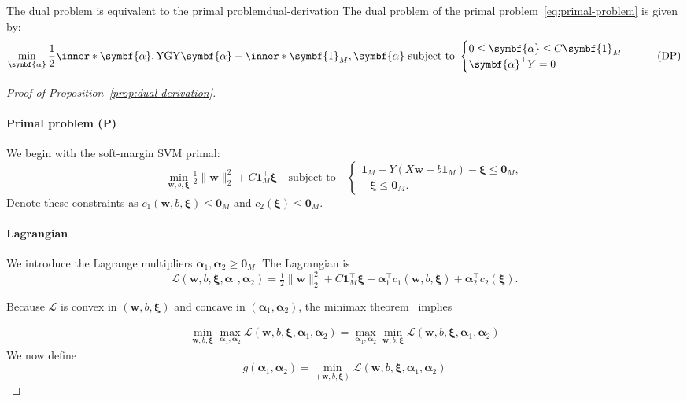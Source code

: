 \begin{proposition}{The dual problem is equivalent to the primal problem}{dual-derivation}
	The dual problem of the primal problem~\eqref{eq:primal-problem} is given by:
	\[
		\min_{\symbf{\alpha}} \frac{1}{2} \inner*{\symbf{\alpha}, \mathrm{Y} \mathrm{G} \mathrm{Y} \symbf{\alpha}} -  \inner*{\symbf{1}_M, \symbf{\alpha}} \text{ subject to }
		\begin{cases}
			0 \leq \symbf{\alpha} \leq C\symbf{1}_M \\
			\symbf{\alpha}^\top Y = 0
		\end{cases} \tag{DP}
	\]

\end{proposition}
\begin{proof}[Proof of Proposition~\ref{prop:dual-derivation}]
	\paragraph{Primal problem (P)}
	We begin with the soft-margin SVM primal:
	\[
		\min_{\symbf{w}, b, \symbf{\xi}}
		\tfrac12\|\symbf{w}\|_2^2
		+ C\symbf{1}_M^\top \symbf{\xi}
		\quad\text{subject to}\quad
		\begin{cases}
			\symbf{1}_M - Y\left(X\symbf{w} + b\symbf{1}_M\right)-\symbf{\xi}\le\symbf{0}_M, \\
			-\symbf{\xi}\le\symbf{0}_M.
		\end{cases}
	\]
	Denote these constraints as \(c_1(\symbf{w}, b, \symbf{\xi}) \le \symbf{0}_M\) and \(c_2(\symbf{\xi}) \le \symbf{0}_M.\)

	\paragraph{Lagrangian}
	We introduce the Lagrange multipliers
	\(\symbf{\alpha}_1,\symbf{\alpha}_2 \ge \symbf{0}_M.
	\)
	The Lagrangian is
	\[
		\mathcal{L}\left(\symbf{w}, b, \symbf{\xi}, \symbf{\alpha}_1,\symbf{\alpha}_2\right) =\tfrac12\|\symbf{w}\|_2^2 +C\symbf{1}_M^\top \symbf{\xi} +\symbf{\alpha}_1^\top c_1(\symbf{w},b,\symbf{\xi}) +\symbf{\alpha}_2^\top c_2(\symbf{\xi}).
	\]

	Because $\mathcal{L}$ is convex in $(\symbf{w},b,\symbf{\xi})$ and concave in $(\symbf{\alpha}_1,\symbf{\alpha}_2)$, the minimax theorem~\cite{vonNeumann1928} implies

	\begin{align*}
		\min_{\symbf{w},b,\symbf{\xi}}\max_{\symbf{\alpha}_1,\symbf{\alpha}_2}\mathcal{L}(\symbf{w},b,\symbf{\xi},\symbf{\alpha}_1,\symbf{\alpha}_2)= \max_{\symbf{\alpha}_1,\symbf{\alpha}_2}\min_{\symbf{w},b,\symbf{\xi}}\mathcal{L}(\symbf{w},b,\symbf{\xi},\symbf{\alpha}_1,\symbf{\alpha}_2)
	\end{align*}
	We now define
	\[
		g(\symbf{\alpha}_1,\symbf{\alpha}_2) =\min_{(\symbf{w},b,\symbf{\xi})}\mathcal{L}(\symbf{w},b,\symbf{\xi},\symbf{\alpha}_1,\symbf{\alpha}_2)
	\]


\end{proof}
